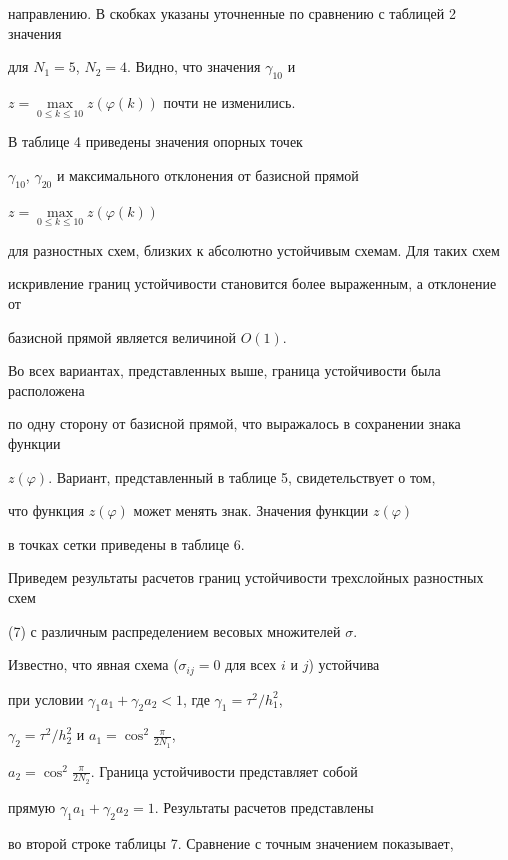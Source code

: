 направлению. В скобках указаны уточненные по сравнению с таблицей 2 значения


для $N_1=5$, $N_2=4$. Видно, что значения $\gamma_{10}$ и


$z = \max\limits_{0\le k\le 10} z( \varphi(k))$ почти не изменились.





В таблице 4 приведены значения опорных точек


$\gamma_{10}$, $\gamma_{20}$ и максимального отклонения от базисной прямой


$z = \max\limits_{0\le k\le 10} z( \varphi(k))$


для разностных схем, близких к абсолютно устойчивым схемам. Для таких схем


искривление границ устойчивости становится более выраженным, а отклонение от


базисной прямой является величиной $O(1)$.





Во всех вариантах, представленных выше, граница устойчивости была расположена


по одну сторону от базисной прямой, что выражалось в сохранении знака функции


$z(\varphi)$. Вариант, представленный в таблице 5, свидетельствует о том,


что функция $z(\varphi)$ может менять знак. Значения функции $z(\varphi)$


в точках сетки приведены в таблице 6.





Приведем результаты расчетов границ устойчивости трехслойных разностных схем


(7) с различным распределением весовых множителей $\sigma$.


Известно, что явная схема ($\sigma_{ij}=0$ для всех $i$ и $j$) устойчива


при условии $\gamma_1 a_1 + \gamma_2 a_2 < 1$, где $\gamma_1 = \tau^2/h_1^2$,


$\gamma_2 = \tau^2/h_2^2$ и $a_1 = \cos^2 \frac{\pi}{2N_1}$,


$a_2 = \cos^2 \frac{\pi}{2N_2}$. Граница устойчивости представляет собой


прямую $\gamma_1 a_1 + \gamma_2 a_2 = 1$. Результаты расчетов представлены


во второй строке таблицы 7. Сравнение с точным значением показывает,


